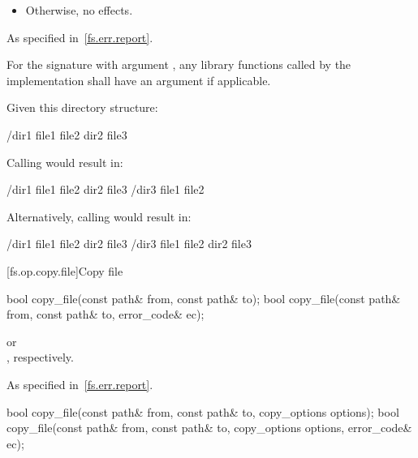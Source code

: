 \begin{itemdescr}
\begin{itemize}
\item
Otherwise, no effects.
\end{itemize}

\pnum
\throws
As specified in~\ref{fs.err.report}.

\pnum
\remarks
For the signature with argument , any
library functions called by the implementation shall have an  argument if applicable.

\pnum
\begin{example}
Given this directory structure:
\begin{codeblock}
/dir1
  file1
  file2
  dir2
    file3
\end{codeblock}

Calling  would result in:
\begin{codeblock}
/dir1
  file1
  file2
  dir2
    file3
/dir3
  file1
  file2
\end{codeblock}

Alternatively, calling  would result in:
\begin{codeblock}
/dir1
  file1
  file2
  dir2
    file3
/dir3
  file1
  file2
  dir2
    file3
\end{codeblock}
\end{example}
\end{itemdescr}


[fs.op.copy.file]{Copy file}

%
\begin{itemdecl}
bool copy_file(const path& from, const path& to);
bool copy_file(const path& from, const path& to, error_code& ec);
\end{itemdecl}

\begin{itemdescr}
\pnum
\returns
{} or\\
, respectively.

\pnum
\throws
As specified in~\ref{fs.err.report}.
\end{itemdescr}

%
\begin{itemdecl}
bool copy_file(const path& from, const path& to, copy_options options);
bool copy_file(const path& from, const path& to, copy_options options,
               error_code& ec);
\end{itemdecl}

